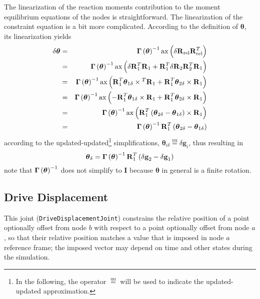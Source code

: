 \documentclass[10pt,dvips,fleqn,subeqn]{report}
\newcommand{\T}[1]{\bm{\mathbf{#1}}}
\newcommand{\equu}{\overset{\text{uu}}{=}}
\begin{document}
The linearization of the reaction moments contribution 
to the moment equilibrium equations of the nodes is straightforward.
The linearization of the constraint equation is a bit more complicated.
According to the definition of $\T{\theta}$, its linearization
yields
\begin{eqnarray*}
	\delta\T{\theta}
		& = & \T{\Gamma}\plbr{\T{\theta}}^{-1} 
			\llk{ax}\plbr{\delta\T{R}_{\text{rel}} \T{R}_{\text{rel}}^T} \\
		& = & \T{\Gamma}\plbr{\T{\theta}}^{-1} \llk{ax}\plbr{
			\delta\T{R}_1^T \T{R}_1
			+ \T{R}_1^T \delta\T{R}_2 \T{R}_2^T \T{R}_1
		} \\
		& = & \T{\Gamma}\plbr{\T{\theta}}^{-1} \llk{ax}\plbr{
			\T{R}_1^T \T{\theta}_{1\delta}\times{}^T \T{R}_1
			+ \T{R}_1^T \T{\theta}_{2\delta}\times{} \T{R}_1
		} \\
		& = & \T{\Gamma}\plbr{\T{\theta}}^{-1} \llk{ax}\plbr{
			- \T{R}_1^T \T{\theta}_{1\delta}\times{} \T{R}_1
			+ \T{R}_1^T \T{\theta}_{2\delta}\times{} \T{R}_1
		} \\
		& = & \T{\Gamma}\plbr{\T{\theta}}^{-1}
			\llk{ax} \plbr{
				\T{R}_1^T \plbr{
					\T{\theta}_{2\delta}
					- \T{\theta}_{1\delta}
				}\times \T{R}_1
			} \\
		& = & \T{\Gamma}\plbr{\T{\theta}}^{-1} \T{R}_1^T \plbr{
			\T{\theta}_{2\delta} - \T{\theta}_{1\delta}
		}
\end{eqnarray*}
according to the updated-updated\footnote{In the following, 
the operator $\equu$ will be used to indicate the updated-updated
approximation.} simplifications,
$\T{\theta}_{i\delta}\equu\delta\T{g}_i$, thus resulting in
\begin{equation}
	\T{\theta}_{\delta} = \T{\Gamma}\plbr{\T{\theta}}^{-1} \T{R}_1^T \plbr{
		\delta\T{g}_2 - \delta\T{g}_1
	}
	\label{eq:DRIVE-HINGE-theta-delta}
\end{equation}
note that $\T{\Gamma}\plbr{\T{\theta}}^{-1}$ does not simplify to $\T{I}$
because $\T{\theta}$ in general is a finite rotation.



\subsection{Drive Displacement}
\label{sec:DriveDisplacementJoint}
This joint (\texttt{DriveDisplacementJoint}) constrains the relative position
of a point optionally offset from node $b$ with respect to a point
optionally offset from node $a$, so that their relative position matches
a value that is imposed in node $a$ reference frame; the imposed vector
may depend on time and other states during the simulation.
\end{document}
